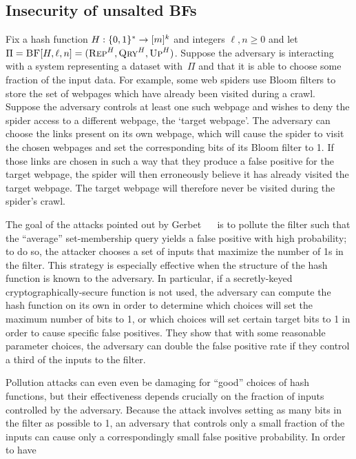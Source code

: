 \subsection{Insecurity of unsalted BFs}
Fix a hash function $H:\{0,1\}^*\to[m]^k$ and integers $\ell,n\geq0$ and let $\Pi
= \textnormal{\textsc{BF}}[H,\ell,n] = (\textnormal{\textsc{Rep}}^H, \textnormal{\textsc{Qry}}^H, \textnormal{\textsc{Up}}^H)$.
%
Suppose the adversary is interacting with a system representing a dataset
with~$\Pi$ and that it is able to choose some fraction of the input data.
For example, some web spiders use Bloom filters to store the set of webpages
which have already been visited during a crawl. Suppose the adversary controls
at least one such webpage and wishes to deny the spider access to a different
webpage, the `target webpage'. The adversary can choose the links present on its
own webpage, which will cause the spider to visit the chosen webpages and set
the corresponding bits of its Bloom filter to 1. If those links are chosen in
such a way that they produce a false positive for the target webpage, the spider
will then erroneously believe it has already visited the target webpage. The
target webpage will therefore never be visited during the spider's crawl.

%
The goal of the attacks pointed out by Gerbet \etal~~\cite{gerbet2015power} is
to pollute the filter such that the ``average'' set-membership query yields a
false positive with high probability; to do so, the attacker chooses a set of
inputs that maximize the number of 1s in the filter. This strategy is especially
effective when the structure of the hash function is known to the adversary. In
particular, if a secretly-keyed cryptographically-secure function is not used,
the adversary can compute the hash function on its own in order to determine
which choices will set the maximum number of bits to 1, or which choices will
set certain target bits to 1 in order to cause specific false positives. They
show that with some reasonable parameter choices, the adversary can double the
false positive rate if they control a third of the inputs to the filter.
%

%
Pollution attacks can even even be damaging for ``good'' choices of hash
functions, but their effectiveness depends crucially on the fraction of inputs
controlled by the adversary. Because the attack involves setting as many bits in
the filter as possible to 1, an adversary that controls only a small fraction of
the inputs can cause only a correspondingly small false positive probability. In
order to have 
%


